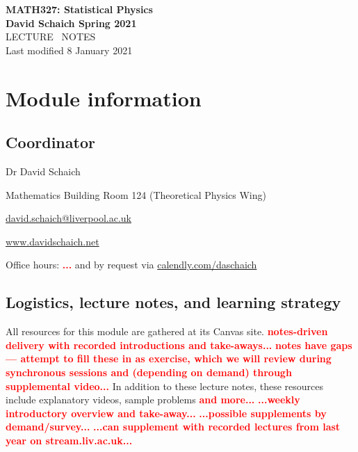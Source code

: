 \documentclass[12 pt]{article}
\newcommand{\TODO}[1]{\textcolor{red}{\textbf{#1}}}
\begin{document}
\begin{center}
  {\LARGE \textbf{MATH327: Statistical Physics}} \\[6 pt]
  \textbf{David Schaich \qquad\qquad\qquad\qquad Spring 2021} \\[48 pt]
  {\LARGE LECTURE \ NOTES} \\[6 pt]
  Last modified 8 January 2021
\end{center}
\renewcommand{\contentsname}{}
\setcounter{tocdepth}{1}
\tableofcontents



\newpage
\setcounter{section}{0}
\section*{Module information}
\subsection*{Coordinator}
\begin{description}
  \setlength{\itemsep}{1pt}
  \setlength{\parskip}{0pt}
  \setlength{\parsep}{0pt}
  \item[\qquad] Dr David Schaich
  \item[\qquad] Mathematics Building Room 124 (Theoretical Physics Wing)
  \item[\qquad] \href{mailto:david.schaich@liverpool.ac.uk}{david.schaich@liverpool.ac.uk}
  \item[\qquad] \href{http://www.davidschaich.net}{www.davidschaich.net} \\
  \item[\qquad] Office hours: \TODO{...} and by request via \href{https://calendly.com/daschaich}{calendly.com/daschaich}
\end{description}



\subsection*{Logistics, lecture notes, and learning strategy}
All resources for this module are gathered at its Canvas site.
\TODO{notes-driven delivery with recorded introductions and take-aways...}
\TODO{notes have gaps --- attempt to fill these in as exercise, which we will review during synchronous sessions and (depending on demand) through supplemental video...}
In addition to these lecture notes, these resources include explanatory videos, sample problems \TODO{and more...}
\TODO{...weekly introductory overview and take-away...}
\TODO{...possible supplements by demand/survey...} %
\TODO{...can supplement with recorded lectures from last year on stream.liv.ac.uk...}
\end{document}
